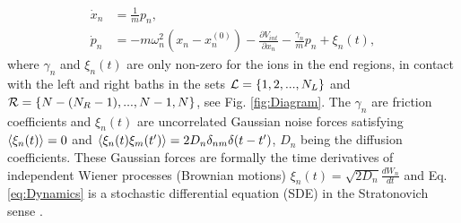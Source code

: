 %
\begin{equation}
    \begin{split}
        \dot{x}_n &= \frac{1}{m}p_n, \\
        \dot{p}_n &= - m\omega_n^2 (x_n-x_n^{(0)}) - \frac{\partial V_{int}}{\partial x_n} - \frac{\gamma_n}{m}p_n + \xi_n(t),
    \end{split}
    \label{eq:Dynamics}
\end{equation}
%
where $\gamma_n$ and $\xi_n(t)$ are only non-zero for the ions in the end regions, in contact with the left and right baths in the sets ${\cal L} = \left\{1,2,...,N_L\right\}$ and \linebreak ${\cal R} = \left\{N-(N_R-1),...,N-1,N\right\}$,  see Fig. \ref{fig:Diagram}. The $\gamma_n$ are friction coefficients and $\xi_n(t)$ are uncorrelated Gaussian noise forces satisfying $\expval{ \xi_n(t)} = 0$ and $\expval{ \xi_n(t)\xi_m(t') } = 2 D_n \delta_{nm}\delta(t-t')$, $D_n$ being the diffusion coefficients. These Gaussian forces are formally the time derivatives of independent Wiener processes (Brownian motions)   $\xi_n(t) = \sqrt{2D_n}\frac{dW_n}{dt}$ \cite{Toral2014,Ruiz2014} and Eq. \eqref{eq:Dynamics} is a stochastic differential equation (SDE) in the Stratonovich sense \cite{Toral2014}.

